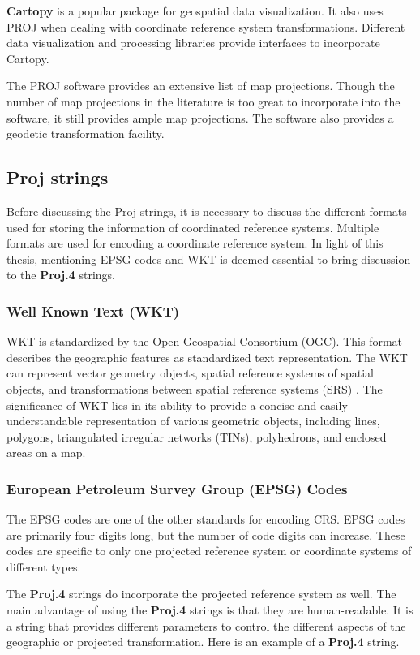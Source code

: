 \textbf{Cartopy} \cite{Cartopy} is a popular package for geospatial data visualization. It also uses PROJ when dealing with coordinate reference system transformations. Different data visualization and processing libraries provide interfaces to incorporate Cartopy.

The PROJ software provides an extensive list of map projections. Though the number of map projections in the literature is too great to incorporate into the software, it still provides ample map projections. The software also provides a geodetic transformation facility.

\subsection{Proj strings}
Before discussing the Proj strings, it is necessary to discuss the different formats used for storing the information of coordinated reference systems. Multiple formats are used for encoding a coordinate reference system. In light of this thesis, mentioning EPSG codes and WKT is deemed essential to bring discussion to the \textbf{Proj.4} strings.

\subsubsection{Well Known Text (WKT)}
WKT is standardized by the Open Geospatial Consortium (OGC)\cite{locWellknownText}. This format describes the geographic features as standardized text representation.
The WKT can represent vector geometry objects, spatial reference systems of spatial objects, and transformations between spatial reference systems (SRS) \cite{locWellknownText}.
The significance of WKT lies in its ability to provide a concise and easily understandable representation of various geometric objects, including lines, polygons, triangulated irregular networks (TINs), polyhedrons, and enclosed areas on a map\cite{locWellknownText}.

\subsubsection{European Petroleum Survey Group (EPSG) Codes}
The EPSG codes are one of the other standards for encoding CRS. EPSG codes are primarily four digits long, but the number of code digits can increase. These codes are specific to only one projected reference system or coordinate systems of different types.

The \textbf{Proj.4} strings do incorporate the projected reference system as well. The main advantage of using the \textbf{Proj.4} strings is that they are human-readable. It is a string that provides different parameters to control the different aspects of the geographic or projected transformation.
Here is an example of a \textbf{Proj.4} string.

